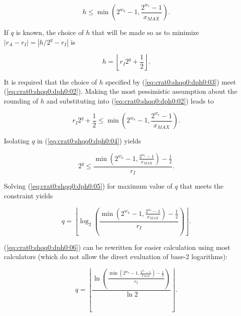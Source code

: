 \begin{equation}
\label{eq:crat0:shqq0:dph0:02}
h \leq \min \left( { 2^{w_h} - 1, \frac{2^{w_r} - 1}{x_{MAX}} } \right ) .
\end{equation}

If $q$ is known, the choice of $h$ that will be made so as to minimize
$|r_A-r_I| = |h/2^q - r_I|$ is

\begin{equation}
\label{eq:crat0:shqq0:dph0:03}
h=\left\lfloor r_I 2^q + \frac{1}{2} \right\rfloor .
\end{equation}

\noindent{}It is required that the choice of $h$ specified by
(\ref{eq:crat0:shqq0:dph0:03}) meet 
(\ref{eq:crat0:shqq0:dph0:02}).  Making the most pessimistic 
assumption about the rounding of $h$ and substituting into
(\ref{eq:crat0:shqq0:dph0:02}) leads to

\begin{equation}
\label{eq:crat0:shqq0:dph0:04}
r_I 2^q + \frac{1}{2}
\leq
\min \left( { 2^{w_h} - 1, \frac{2^{w_r} - 1}{x_{MAX}} } \right ) .
\end{equation}

\noindent{}Isolating $q$ in (\ref{eq:crat0:shqq0:dph0:04})
yields

\begin{equation}
\label{eq:crat0:shqq0:dph0:05}
2^q 
\leq
\frac{\min \left( { 2^{w_h} - 1, \frac{2^{w_r} - 1}{x_{MAX}} } \right ) - \frac{1}{2}}
{r_I}.
\end{equation}

\noindent{}Solving 
(\ref{eq:crat0:shqq0:dph0:05})
for maximum value of $q$ that meets the constraint yields

\begin{equation}
\label{eq:crat0:shqq0:dph0:06}
q=
\left\lfloor
{
\log_2
\left(
{
\frac{\min \left( { 2^{w_h} - 1, \frac{2^{w_r} - 1}{x_{MAX}} } \right ) - \frac{1}{2}}{r_I}
}
\right)
}
\right\rfloor .
\end{equation}

\noindent{}(\ref{eq:crat0:shqq0:dph0:06})
can be rewritten for easier calculation using most calculators (which do
not allow the direct evaluation of base-2 logarithms):

\begin{equation}
\label{eq:crat0:shqq0:dph0:07}
q=
\left\lfloor
\frac
{
{
\ln
\left(
{
\frac{\min \left( { 2^{w_h} - 1, \frac{2^{w_r} - 1}{x_{MAX}} } \right ) - \frac{1}{2}}{r_I}
}
\right)
}
}
{\ln 2}
\right\rfloor .
\end{equation}

